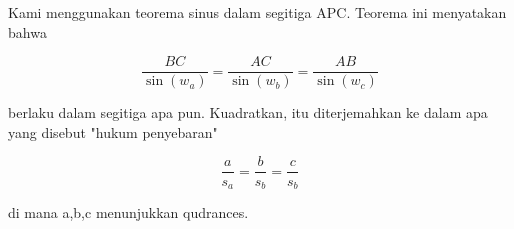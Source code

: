 \documentclass{article}
\begin{document}
\begin{eulernotebook}
\begin{eulercomment}
\begin{eulercomment}
\begin{eulercomment}
Kami menggunakan teorema sinus dalam segitiga APC. Teorema ini
menyatakan bahwa

\end{eulercomment}
\begin{eulerformula}
\[
\frac{BC}{\sin(w_a)} = \frac{AC}{\sin(w_b)} = \frac{AB}{\sin(w_c)}
\]
\end{eulerformula}
\begin{eulercomment}
berlaku dalam segitiga apa pun. Kuadratkan, itu diterjemahkan ke dalam
apa yang disebut "hukum penyebaran"

\end{eulercomment}
\begin{eulerformula}
\[
\frac{a}{s_a} = \frac{b}{s_b} = \frac{c}{s_b}
\]
\end{eulerformula}
\begin{eulercomment}
di mana a,b,c menunjukkan qudrances.


\end{eulercomment}
\end{eulercomment}
\end{eulercomment}
\end{eulernotebook}
\end{document}
